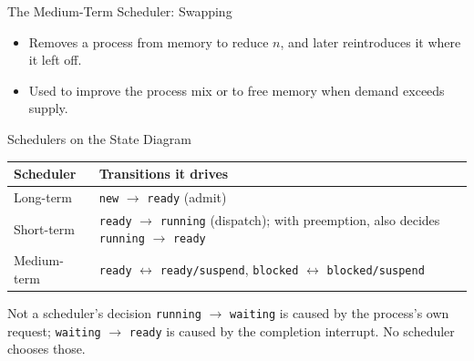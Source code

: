\documentclass[aspectratio=169]{beamer}
\begin{document}
\begin{frame}{The Medium-Term Scheduler: Swapping}
  \centering
  \vspace{0.2cm}
  \begin{itemize}
    \item Removes a process from memory to reduce $n$, and later reintroduces
      it where it left off.
    \item Used to improve the process mix or to free memory when demand
      exceeds supply.
  \end{itemize}
\end{frame}

\begin{frame}{Schedulers on the State Diagram}
  \small
  \renewcommand{\arraystretch}{1.3}
  \begin{tabular}{@{}p{}p{}@{}}
    \textbf{Scheduler} & \textbf{Transitions it drives} \\
    \hline
    Long-term & \texttt{new} $\to$ \texttt{ready} (admit) \\
    Short-term & \texttt{ready} $\to$ \texttt{running} (dispatch); with
      preemption, also decides \texttt{running} $\to$ \texttt{ready} \\
    Medium-term & \texttt{ready} $\leftrightarrow$ \texttt{ready/suspend},
      \texttt{blocked} $\leftrightarrow$ \texttt{blocked/suspend} \\
  \end{tabular}
  \vspace{0.3cm}
  \begin{block}{Not a scheduler's decision}
    \texttt{running} $\to$ \texttt{waiting} is caused by the process's own
    request; \texttt{waiting} $\to$ \texttt{ready} is caused by the
    completion interrupt. No scheduler chooses those.
  \end{block}
\end{frame}
\end{document}
